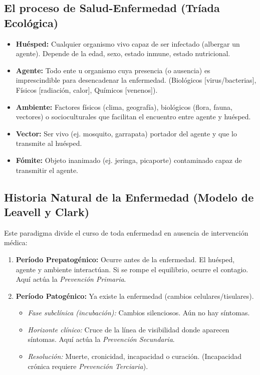\subsection{El proceso de Salud-Enfermedad (Tríada Ecológica)}
\begin{itemize}
    \item \textbf{Huésped:} Cualquier organismo vivo capaz de ser infectado (albergar un agente). Depende de la edad, sexo, estado inmune, estado nutricional.
    \item \textbf{Agente:} Todo ente u organismo cuya presencia (o ausencia) es imprescindible para desencadenar la enfermedad. (Biológicos [virus/bacterias], Físicos [radiación, calor], Químicos [venenos]).
    \item \textbf{Ambiente:} Factores físicos (clima, geografía), biológicos (flora, fauna, vectores) o socioculturales que facilitan el encuentro entre agente y huésped.
    \item \textbf{Vector:} Ser vivo (ej. mosquito, garrapata) portador del agente y que lo transmite al huésped.
    \item \textbf{Fómite:} Objeto inanimado (ej. jeringa, picaporte) contaminado capaz de transmitir el agente.
\end{itemize}

\subsection{Historia Natural de la Enfermedad (Modelo de Leavell y Clark)}
Este paradigma divide el curso de toda enfermedad en ausencia de intervención médica:
\begin{enumerate}
    \item \textbf{Período Prepatogénico:} Ocurre antes de la enfermedad. El huésped, agente y ambiente interactúan. Si se rompe el equilibrio, ocurre el contagio. Aquí actúa la \textit{Prevención Primaria}.
    \item \textbf{Período Patogénico:} Ya existe la enfermedad (cambios celulares/tisulares).
    \begin{itemize}
        \item \textit{Fase subclínica (incubación):} Cambios silenciosos. Aún no hay síntomas.
        \item \textit{Horizonte clínico:} Cruce de la línea de visibilidad donde aparecen síntomas. Aquí actúa la \textit{Prevención Secundaria}.
        \item \textit{Resolución:} Muerte, cronicidad, incapacidad o curación. (Incapacidad crónica requiere \textit{Prevención Terciaria}).
    \end{itemize}
\end{enumerate}

